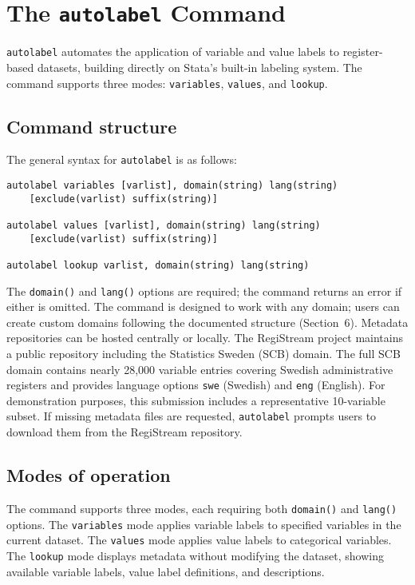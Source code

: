 \section{The \texttt{autolabel} Command}

\texttt{autolabel} automates the application of variable and value labels to register-based datasets, building directly on Stata's built-in labeling system. The command supports three modes: \texttt{variables}, \texttt{values}, and \texttt{lookup}.

\subsection{Command structure}

The general syntax for \texttt{autolabel} is as follows:

\begin{verbatim}
autolabel variables [varlist], domain(string) lang(string)
    [exclude(varlist) suffix(string)]

autolabel values [varlist], domain(string) lang(string)
    [exclude(varlist) suffix(string)]

autolabel lookup varlist, domain(string) lang(string)
\end{verbatim}

The \texttt{domain()} and \texttt{lang()} options are required; the command returns an error if either is omitted. The command is designed to work with any domain; users can create custom domains following the documented structure (Section~6). Metadata repositories can be hosted centrally or locally. The RegiStream project \citep{registream2024} maintains a public repository including the Statistics Sweden (SCB) domain. The full SCB domain contains nearly 28,000 variable entries covering Swedish administrative registers and provides language options \texttt{swe} (Swedish) and \texttt{eng} (English). For demonstration purposes, this submission includes a representative 10-variable subset. If missing metadata files are requested, \texttt{autolabel} prompts users to download them from the RegiStream repository.

\subsection{Modes of operation}

The command supports three modes, each requiring both \texttt{domain()} and \texttt{lang()} options. The \texttt{variables} mode applies variable labels to specified variables in the current dataset. The \texttt{values} mode applies value labels to categorical variables. The \texttt{lookup} mode displays metadata without modifying the dataset, showing available variable labels, value label definitions, and descriptions.

